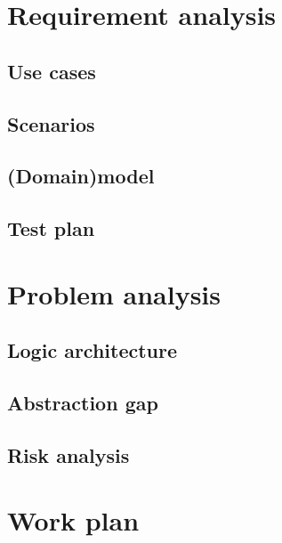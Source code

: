 \documentclass{llncs}
\newcommand{\labelsec}[1]{\label{sec:#1}}
\newcommand{\labelssec}[1]{\label{ssec:#1}}
\begin{document}

 
\section{Requirement analysis}
\labelsec{ReqAnalysis}
\subsection{Use cases}
\labelssec{UseCases}

\subsection{Scenarios}
\labelssec{Scenarios}

\subsection{(Domain)model}

\subsection{Test plan}

\section{Problem analysis}
\labelsec{ProblemAnalysis}
\subsection{Logic architecture}
\subsection{Abstraction gap}
\subsection{Risk analysis}

\section{Work plan}
\labelsec{wplan}
\end{document}
